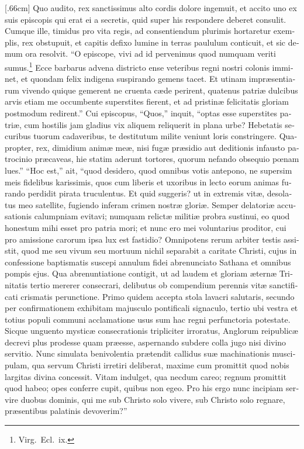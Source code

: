 \documentclass[10pt]{book}
\begin{document}
\begin{paracol}{2}
\begin{otherlanguage}{latin}
[.66cm]
Quo audito, rex sanctissimus alto cordis dolore ingemuit, et accito uno ex suis episcopis qui erat ei a secretis, quid super his respondere deberet consulit. Cumque ille, timidus pro vita regis, ad consentiendum plurimis hortaretur exemplis, rex obstupuit, et capitis defixo lumine in terras paululum conticuit, et sic demum ora resolvit. ``O episcope, vivi ad id pervenimus quod numquam veriti sumus.\footnote[\textdagger]{Virg.\ Ecl.\ ix.} Ecce barbarus advena districto ense veteribus regni nostri colonis imminet, et quondam felix indigena suspirando gemens tacet. Et utinam impr\ae{}sentiarum vivendo quique gemerent ne cruenta c\ae{}de perirent, quatenus patri\ae{} dulcibus arvis etiam me occumbente superstites fierent, et ad pristin\ae{} felicitatis gloriam postmodum redirent.'' Cui episcopus, ``Quos,'' inquit, ``optas esse superstites patri\ae{}, cum hostilis jam gladius vix aliquem reliquerit in plana urbe? Hebetatis securibus tuorum cadaveribus, te destitutum milite veniunt loris constringere. Quapropter, rex, dimidium anim\ae{} me\ae{}, nisi fug\ae{} pr\ae{}sidio aut deditionis infausto patrocinio pr\ae{}caveas, hie statim aderunt tortores, quorum nefando obsequio p\oe{}nam lues.'' ``Hoc est,'' ait, ``quod desidero, quod omnibus votis antepono, ne supersim meis fidelibus karissimis, quos cum liberis et uxoribus in lecto eorum animas furando perdidit pirata truculentus. Et quid suggeris? ut in extremis vit\ae{}, desolatus meo satellite, fugiendo inferam crimen nostr\ae{} glori\ae{}. Semper delatori\ae{} accusationis calumpniam evitavi; numquam relict\ae{} militi\ae{} probra sustinui, eo quod honestum mihi esset pro patria mori; et nunc ero mei voluntarius proditor, cui pro amissione carorum ipsa lux est fastidio? Omnipotens rerum arbiter testis assistit, quod me seu vivum seu mortuum nichil separabit a caritate Christi, cujus in confessione baptismatis suscepi annulum fidei abrenunciato Sathana et omnibus pompis ejus. Qua abrenuntiatione contigit, ut ad laudem et gloriam \ae{}tern\ae{} Trinitatis tertio mererer consecrari, delibutus ob compendium perennis vit\ae{} sanctificati crismatis perunctione. Primo quidem accepta stola lavacri salutaris, secundo per confirmationem exhibitam majusculo pontificali signaculo, tertio ubi vestra et totius populi communi acclamatione usus sum hac regni perfunctoria potestate. Sicque unguento mystic\ae{} consecrationis tripliciter irroratus, Anglorum reipublic\ae{} decrevi plus prodesse quam pr\ae{}esse, aspernando subdere colla jugo nisi divino servitio. Nunc simulata benivolentia pr\ae{}tendit callidus su\ae{} machinationis muscipulam, qua servum Christi irretiri deliberat, maxime cum promittit quod nobis largitas divina concessit. Vitam indulget, qua necdum careo; regnum promittit quod habeo; opes conferre cupit, quibus non egeo. Pro his ergo nunc incipiam servire duobus dominis, qui me sub Christo solo vivere, sub Christo solo regnare, pr\ae{}sentibus palatinis devoverim?''
\end{otherlanguage}


\end{paracol}
\end{document}

